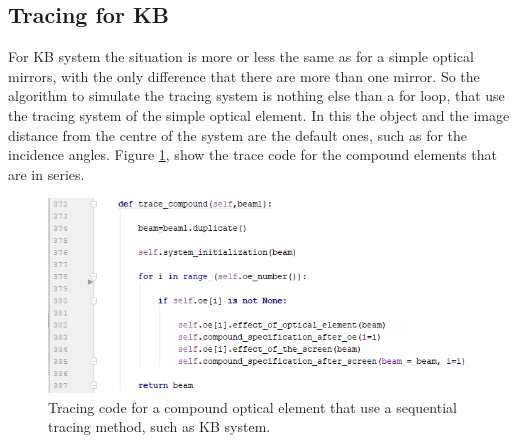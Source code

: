 \subsection{Tracing for KB}
For KB system the situation is more or less the same as for a simple optical mirrors, with the only difference that there are more than one mirror. So the algorithm to simulate the tracing system is nothing else than a for loop, that use the tracing system of the simple optical element. In this the object and the image distance from the centre  of the system are the default ones, such as for the incidence angles. Figure \ref{fig: CodeTraceCompund}, show the trace code for the compound elements that are in series.
\begin{figure}[H]
%
\centering
%
\includegraphics[width=1.\textwidth]{Immagini/Chapter3/CodeTraceCompound}
%
\caption{Tracing code for a compound optical element that use a sequential tracing method, such as KB system.}
%
\label{fig: CodeTraceCompund}
%
\end{figure}
